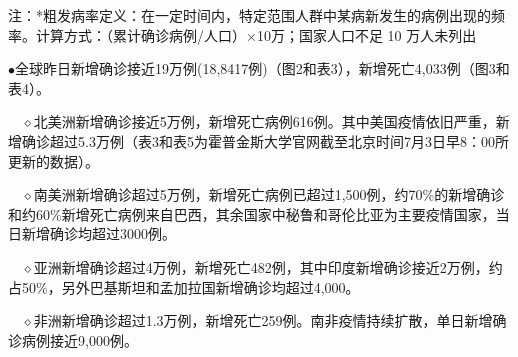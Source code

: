 \documentclass[
]{article}
\begin{document}
\begin{table}[H]
\begin{table}[H]
\endgroup{}
\end{table} \begin{tablenotes}
        \fontsize{15}{15}
        \selectfont
        \item 注：*粗发病率定义：在一定时间内，特定范围人群中某病新发生的病例出现的频率。计算方式：（累计确诊病例/人口）×10万；国家人口不足 10 万人未列出 %
      \end{tablenotes}
\end{table}

\(\bullet\)全球昨日新增确诊接近19万例(18,8417例)（图2和表3），新增死亡4,033例（图3和表4）。

\(\quad\)\(\diamond\)北美洲新增确诊接近5万例，新增死亡病例616例。其中美国疫情依旧严重，新增确诊超过5.3万例（表3和表5为霍普金斯大学官网截至北京时间7月3日早8：00所更新的数据）。

\(\quad\)\(\diamond\)南美洲新增确诊超过5万例，新增死亡病例已超过1,500例，约70\%的新增确诊和约60\%新增死亡病例来自巴西，其余国家中秘鲁和哥伦比亚为主要疫情国家，当日新增确诊均超过3000例。

\(\quad\)\(\diamond\)亚洲新增确诊超过4万例，新增死亡482例，其中印度新增确诊接近2万例，约占50\%，另外巴基斯坦和孟加拉国新增确诊均超过4,000。

\(\quad\)\(\diamond\)非洲新增确诊超过1.3万例，新增死亡259例。南非疫情持续扩散，单日新增确诊病例接近9,000例。
\end{document}

